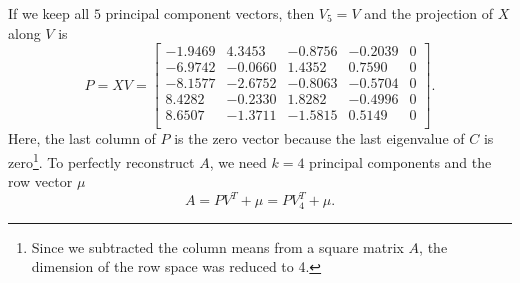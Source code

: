 If we keep all \(5\) principal component vectors, then \(V_5 = V\) and the projection of \(X\) along \(V\) is
\[P = XV = \begin{bmatrix}
    -1.9469 &  4.3453 & -0.8756 & -0.2039 & 0 \\
    -6.9742 & -0.0660 &  1.4352 &  0.7590 & 0 \\
    -8.1577 & -2.6752 & -0.8063 & -0.5704 & 0 \\
        8.4282 & -0.2330 &  1.8282 & -0.4996 & 0 \\
        8.6507 & -1.3711 & -1.5815 &  0.5149 & 0 \\
\end{bmatrix}.\]
Here, the last column of \(P\) is the zero vector because the last eigenvalue of \(C\) is zero\footnote{Since we subtracted the column means from a square matrix \(A\), the dimension of the row space was reduced to 4.}.
To perfectly reconstruct \(A\), we need \(k = 4\) principal components and the row vector \(\mu\)
\[A = PV^T + \mu = PV_4^T + \mu.\]

